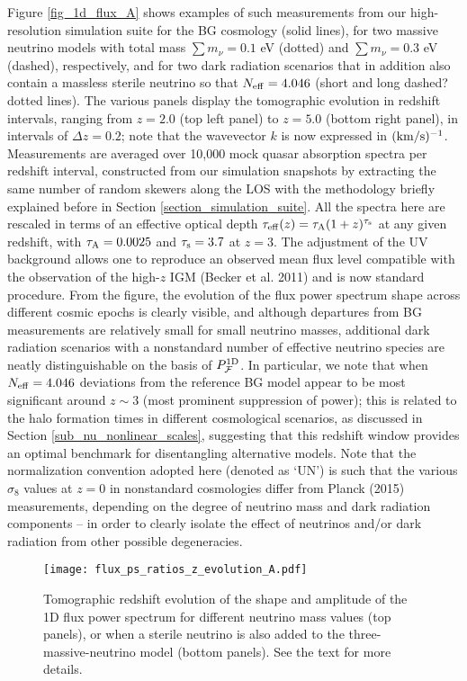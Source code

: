 \documentclass{emulateapj}
\begin{document}
Figure \ref{fig_1d_flux_A} shows examples of such measurements from
our high-resolution simulation suite for the BG cosmology (solid lines), for two massive neutrino models
with total mass $\sum m_{\nu}=0.1$ eV (dotted) and $\sum m_{\nu}=0.3$ eV (dashed), respectively,  
and for two dark radiation scenarios that in addition also contain a massless sterile neutrino so that $N_{\rm eff}=4.046$
(short and long dashed?dotted lines). The various panels display the tomographic evolution in redshift 
intervals, ranging from $z=2.0$ (top left panel) to $z=5.0$ (bottom right panel), in intervals of $\Delta z=0.2$; note that the wavevector 
$k$ is now expressed in $\rm (km /s)^{-1}$. Measurements are averaged over 10,000 mock quasar
absorption spectra per redshift interval, constructed from our simulation snapshots by extracting the same number of random skewers
along the LOS with the methodology briefly explained before  in Section \ref{section_simulation_suite}. 
All the spectra here are 
rescaled  in terms of 
an effective optical depth $\tau_{\rm eff}(z) = \tau_{\rm A} (1+z)^{\tau_{\rm s}}$ at any given redshift, with
 $\tau_{\rm A} =0.0025$ and  $\tau_{\rm s} =3.7$ at $z=3$. The 
adjustment of the UV background allows one to reproduce 
an observed mean flux level compatible with the observation of the high-$z$ IGM 
(Becker et al. 2011) and is now standard procedure. 
From the figure, the evolution of the flux power spectrum shape across different cosmic epochs is clearly visible, 
and although departures from BG measurements are relatively small for small neutrino masses, 
additional dark radiation scenarios with a nonstandard number of effective neutrino species  are neatly distinguishable on the basis of $P^{\rm 1D}_{{\cal{F}}}$.
In particular, we note that when $N_{\rm eff}=4.046$ deviations from the reference BG model appear to be most significant around $z \sim 3$ (most prominent suppression of power); 
this is related to the halo formation times in different cosmological scenarios, as discussed in Section \ref{sub_nu_nonlinear_scales}, suggesting that
this redshift window provides an optimal benchmark for disentangling alternative models.
Note that the normalization convention adopted here (denoted as `UN') is such that 
the various $\sigma_8$ values at $z=0$ in nonstandard cosmologies differ from Planck (2015) measurements, 
depending on the degree of neutrino mass and dark radiation components -- 
in order to clearly isolate the effect of neutrinos and/or dark radiation from other possible degeneracies.  

\begin{figure*}
\centering
\texttt{[image: flux\_ps\_ratios\_z\_evolution\_A.pdf]}
\caption{Tomographic redshift evolution of the shape and amplitude of the 1D flux power spectrum for different neutrino mass values  (top panels), or
when a sterile neutrino is also added to the three-massive-neutrino model (bottom panels). See the text for more details.}
\label{fig_1d_flux_C}
\end{figure*}
\end{document}
